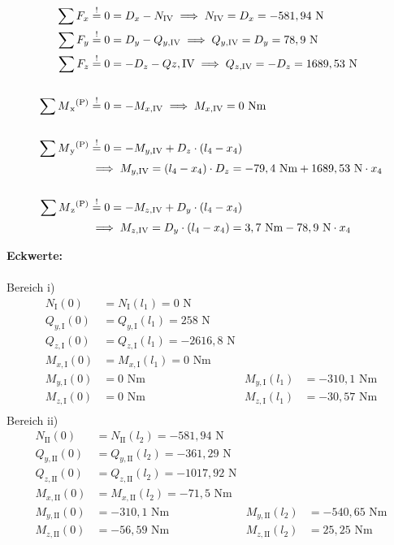 \begin{enumerate}
\begin{center}
\end{center}
\begin{align*}
	\sum F_x &\overset{!}{=} 0 = D_x - N_{\mathrm{IV}} 
		\implies  N_{\mathrm{IV}} = D_x = -581,94 \text { N}\\ 
	\sum F_y &\overset{!}{=} 0 =D_y - Q_{y,\mathrm{IV}}
		\implies Q_{y,\mathrm{IV}} = D_y = 78,9 \text{ N}\\ 
	\sum F_z &\overset{!}{=} 0 = -D_z -Q{z,\mathrm{IV}} 
		\implies Q_{z,\mathrm{IV}} = -D_z = 1689,53 \text{ N} \\ \\
	\sum M\textsubscript{x}\textsuperscript{(P)} &\overset{!}{=} 0 =- M_{x,\mathrm{IV}}  
		\implies M_{x,\mathrm{IV}} = 0 \text{ Nm} \\ \\
	\sum M\textsubscript{y}\textsuperscript{(P)} &\overset{!}{=} 0 =- M_{y,\mathrm{IV}} + D_z \cdot  (l_4 - x_4) \\
		&\implies M_{y,\mathrm{IV}} =  (l_4 - x_4) \cdot D_z =-79,4\text{ Nm} +1689,53 \text{ N} \cdot x_4\\ \\
	\sum M\textsubscript{z}\textsuperscript{(P)} &\overset{!}{=} 0 = - M_{z,\mathrm{IV}} + D_y \cdot  (l_4 - x_4)  \\
		&\implies  M_{z,\mathrm{IV}} =  D_y \cdot (l_4 - x_4) = 3,7\text{ Nm} -78,9 \text{ N} \cdot x_4
	\end{align*}
\end{enumerate}
\newpage
\textbf{Eckwerte:}\\ \\
Bereich i)
\begin{align*}
	N_{\mathrm{I}} (0) &= N_{\mathrm{I}} (l_1) = 0 \text{ N}\\
	Q_{y,\mathrm{I}} (0) &= Q_{y,\mathrm{I}} (l_1) = 258\text{ N}\\
	Q_{z,\mathrm{I}} (0) &= Q_{z,\mathrm{I}} (l_1) = -2616,8\text{ N}\\
	M_{x,\mathrm{I}} (0) &=  M_{x,\mathrm{I}} (l_1) = 0\text{ Nm}\\
	M_{y,\mathrm{I}} (0) &=  0\text{ Nm} & M_{y,\mathrm{I}} (l_1) &= -310,1\text{ Nm}\\
	M_{z,\mathrm{I}} (0) &= 0\text{ Nm} & M_{z,\mathrm{I}} (l_1) &= -30,57\text{ Nm}\\
\end{align*}
Bereich ii)
\begin{align*}
	N_{\mathrm{II}} (0) &= N_{\mathrm{II}} (l_2) = -581,94 \text{ N}\\
	Q_{y,\mathrm{II}} (0) &= Q_{y,\mathrm{II}} (l_2) =-361,29\text{ N}\\
	Q_{z,\mathrm{II}} (0) &= Q_{z,\mathrm{II}} (l_2) = -1017,92\text{ N}\\
	M_{x,\mathrm{II}} (0) &= M_{x,\mathrm{II}} (l_2) = -71,5\text{ Nm}\\
	M_{y,\mathrm{II}} (0) &=  -310,1 \text{ Nm} & M_{y,\mathrm{II}} (l_2) &= -540,65\text{ Nm}\\
	M_{z,\mathrm{II}} (0) &=  -56,59\text{ Nm} &M_{z,\mathrm{II}} (l_2) &= 25,25\text{ Nm}\\
\end{align*}
